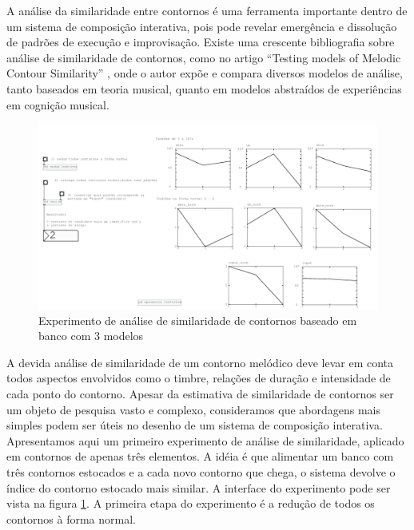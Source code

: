 \documentclass{ppgmus}
\begin{document}
A análise da similaridade entre contornos é uma ferramenta importante dentro
 de um sistema de composição interativa, pois pode revelar emergência e dissolução de 
padrões de execução e improvisação. 
Existe uma crescente bibliografia sobre análise de similaridade de contornos,
como no artigo ``Testing models of Melodic Contour Similarity'' \cite{schmuckler}, onde o autor expõe e compara diversos modelos de análise,
tanto baseados em teoria musical, quanto em modelos abstraídos de experiências
em cognição musical.

\begin{figure}
\includegraphics[scale=.4]{similaridade-interface}
\caption{Experimento de análise de similaridade de contornos baseado em banco com 3 modelos}
\label{similaridade-interface}
\end{figure}

A devida análise de similaridade de um contorno melódico deve levar em conta todos
aspectos envolvidos como o timbre, relações de duração e intensidade de cada ponto do contorno.
Apesar da estimativa de similaridade de contornos ser um objeto de pesquisa vasto e complexo, 
consideramos que abordagens
mais simples podem ser úteis no desenho de um sistema de composição interativa.
Apresentamos aqui um primeiro experimento de análise de similaridade, aplicado em
contornos de apenas três elementos. A idéia é que alimentar um banco com três contornos estocados e a cada
novo contorno que chega, o sistema devolve o índice do contorno estocado mais similar.
A interface do experimento pode ser vista na figura \ref{similaridade-interface}.
A primeira etapa do experimento é a redução de todos os contornos à forma normal.
\end{document}
